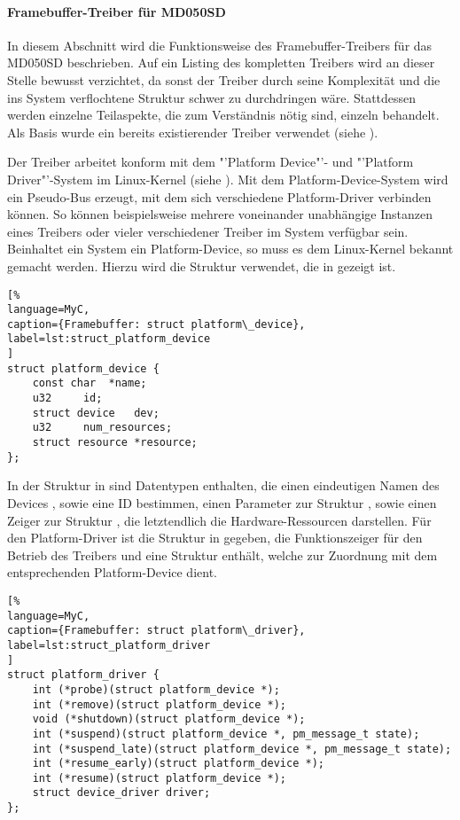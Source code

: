 \paragraph{Framebuffer-Treiber für MD050SD}
In diesem Abschnitt wird die Funktionsweise des Framebuffer-Treibers für das MD050SD beschrieben. Auf ein Listing des kompletten Treibers wird an dieser Stelle bewusst verzichtet, da sonst der Treiber durch seine Komplexität und die ins System verflochtene Struktur schwer zu durchdringen wäre. Stattdessen werden einzelne Teilaspekte, die zum Verständnis nötig sind, einzeln behandelt. Als Basis wurde ein bereits existierender Treiber verwendet (siehe \cite{Schlegel2013c}).

Der Treiber arbeitet konform mit dem "'Platform Device"'- und "'Platform Driver"'-System im Linux-Kernel (siehe \cite{LinuxKernelPlatformDeviceDriver}). Mit dem Platform-Device-System wird ein Pseudo-Bus erzeugt, mit dem sich verschiedene Platform-Driver verbinden können. So können beispielsweise mehrere voneinander unabhängige Instanzen eines Treibers oder vieler verschiedener Treiber im System verfügbar sein. Beinhaltet ein System ein Platform-Device, so muss es dem Linux-Kernel bekannt gemacht werden. Hierzu wird die Struktur  verwendet, die in  gezeigt ist.

\begin{lstlisting}[%
language=MyC,
caption={Framebuffer: struct platform\_device},
label=lst:struct_platform_device
]
struct platform_device {
	const char	*name;
	u32		id;
	struct device	dev;
	u32		num_resources;
	struct resource	*resource;
};
\end{lstlisting}

In der Struktur in  sind Datentypen enthalten, die einen eindeutigen Namen des Devices , sowie eine ID   bestimmen, einen Parameter zur Struktur , sowie einen Zeiger zur Struktur , die letztendlich die Hardware-Ressourcen darstellen. Für den Platform-Driver ist die Struktur  in  gegeben, die Funktionszeiger für den Betrieb des Treibers und eine Struktur  enthält, welche zur Zuordnung mit dem entsprechenden Platform-Device dient.
\begin{lstlisting}[%
language=MyC,
caption={Framebuffer: struct platform\_driver},
label=lst:struct_platform_driver
]
struct platform_driver {
	int (*probe)(struct platform_device *);
	int (*remove)(struct platform_device *);
	void (*shutdown)(struct platform_device *);
	int (*suspend)(struct platform_device *, pm_message_t state);
	int (*suspend_late)(struct platform_device *, pm_message_t state);
	int (*resume_early)(struct platform_device *);
	int (*resume)(struct platform_device *);
	struct device_driver driver;
};
\end{lstlisting}


